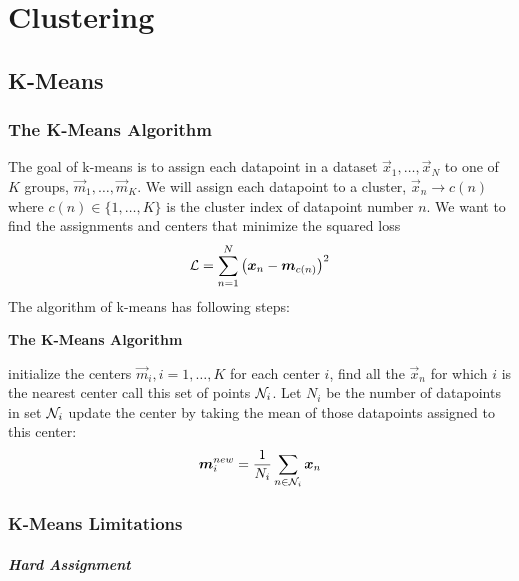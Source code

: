 
\chapter{Clustering}
\label{chapter10}



\section{K-Means}
\label{section10.1}

\subsection{The K-Means Algorithm}

The goal of k-means is to assign each datapoint in a dataset $\vec{x}_1,\dotsc,\vec{x}_N$ to one of $K$ groups, $\vec{m}_1,\dotsc,\vec{m}_K$. We will assign each datapoint to a cluster, $\vec{x}_n\to c(n)$ where $c(n)\in\{1,\dotsc,K\}$ is the cluster index of datapoint number $n$. We want to find the assignments and centers that minimize the squared loss
\begin{align*}
\cL=\sum_{n=1}^N\left(\vec{x}_n-\vec{m}_{c(n)}\right)^2
\end{align*}
The algorithm of k-means has following steps:
\begin{algorithm}[H]
	\caption*{\bf The K-Means Algorithm}
	\begin{algorithmic}
		\State initialize the centers $\vec{m}_i,i=1,\dotsc,K$
		\State for each center $i$, find all the $\vec{x}_n$ for which $i$ is the nearest center
		\State call this set of points $\cN_i$. Let $N_i$ be the number of datapoints in set $\cN_i$
		\State update the center by taking the mean of those datapoints assigned to this center:
		\begin{align*}
		\vec{m}_i^{new}=\frac{1}{N_i}\sum_{n\in\cN_i}\vec{x}_n
		\end{align*}
		\EndWhile
	\end{algorithmic}
\end{algorithm}

\subsection{K-Means Limitations}

\paragraph{Hard Assignment}

